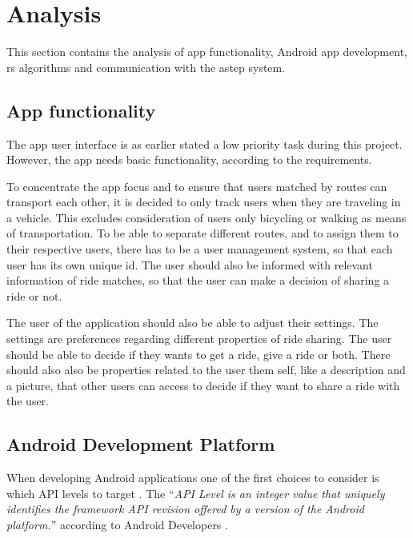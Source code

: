 \section{Analysis}
This section contains the analysis of app functionality, Android app development, \gls{rs} algorithms and communication with the \gls{astep} system.

\subsection{App functionality}
The app user interface is as earlier stated a low priority task during this project.
However, the app needs basic functionality, according to the requirements.

To concentrate the app focus and to ensure that users matched by routes can transport each other, it is decided to only track users when they are traveling in a vehicle.
This excludes consideration of users only bicycling or walking as means of transportation.
To be able to separate different routes, and to assign them to their respective users, there has to be a user management system, so that each user has its own unique id.
The user should also be informed with relevant information of ride matches, so that the user can make a decision of sharing a ride or not.

The user of the application should also be able to adjust their settings.
The settings are preferences regarding different properties of ride sharing.
The user should be able to decide if they wants to get a ride, give a ride or both.
There should also also be properties related to the user them self, like a description and a picture, that other users can access to decide if they want to share a ride with the user.


\subsection{Android Development Platform}
When developing Android applications one of the first choices to consider is which API levels to target \cite{usesSDK}.
The ``\textit{API Level is an integer value that uniquely identifies the framework API revision offered by a version of the Android platform.}'' according to Android Developers \cite{usesSDK}.

